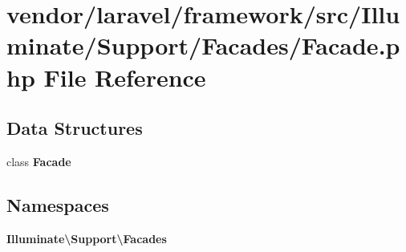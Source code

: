 \section{vendor/laravel/framework/src/\+Illuminate/\+Support/\+Facades/\+Facade.php File Reference}
\label{laravel_2framework_2src_2_illuminate_2_support_2_facades_2_facade_8php}
\subsection*{Data Structures}
\begin{DoxyCompactItemize}
\item 
class {\bf Facade}
\end{DoxyCompactItemize}
\subsection*{Namespaces}
\begin{DoxyCompactItemize}
\item 
 {\bf Illuminate\textbackslash{}\+Support\textbackslash{}\+Facades}
\end{DoxyCompactItemize}
